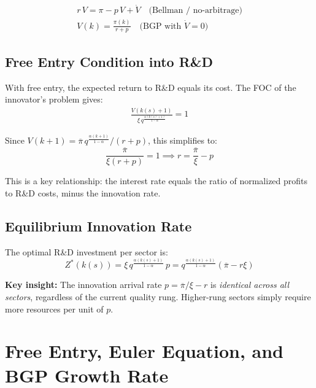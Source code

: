\documentclass[a4paper,11pt]{article}
\newcommand{\pibar}{\overline{\pi}}
\begin{document}
\begin{resultbox}
\begin{align*}
\boxed{r\,V = \pi - p\,V + \dot{V}} \quad \text{(Bellman / no-arbitrage)}
\tag{HJB} \\[0.5em]
\boxed{V(k) = \frac{\pi(k)}{r + p}} \quad \text{(BGP with } \dot{V}=0\text{)}
\tag{Value}
\end{align*}
\end{resultbox}

\subsection*{Free Entry Condition into R\&D}

With free entry, the expected return to R\&D equals its cost. The FOC of the innovator's problem gives:
\begin{align*}
\frac{V(k(s)+1)}{\xi\, q^{\frac{\alpha(k(s)+1)}{1-\alpha}}} = 1
\tag{Free Entry}
\end{align*}

Since $V(k+1) = \pibar\, q^{\frac{\alpha(k+1)}{1-\alpha}} / (r+p)$, this simplifies to:
\[
\frac{\pibar}{\xi(r+p)} = 1 \implies \boxed{r = \frac{\pibar}{\xi} - p}
\tag{Free Entry Simplified}
\]

This is a key relationship: the interest rate equals the ratio of normalized profits to R\&D costs, minus the innovation rate.

\subsection*{Equilibrium Innovation Rate}

The optimal R\&D investment per sector is:
\[
Z^*(k(s)) = \xi\, q^{\frac{\alpha(k(s)+1)}{1-\alpha}}\, p = q^{\frac{\alpha(k(s)+1)}{1-\alpha}}(\pibar - r\xi)
\]

\textbf{Key insight:} The innovation arrival rate $p = \pibar/\xi - r$ is \emph{identical across all sectors}, regardless of the current quality rung. Higher-rung sectors simply require more resources per unit of $p$.

\clearpage

\section{Free Entry, Euler Equation, and BGP Growth Rate}
\end{document}
